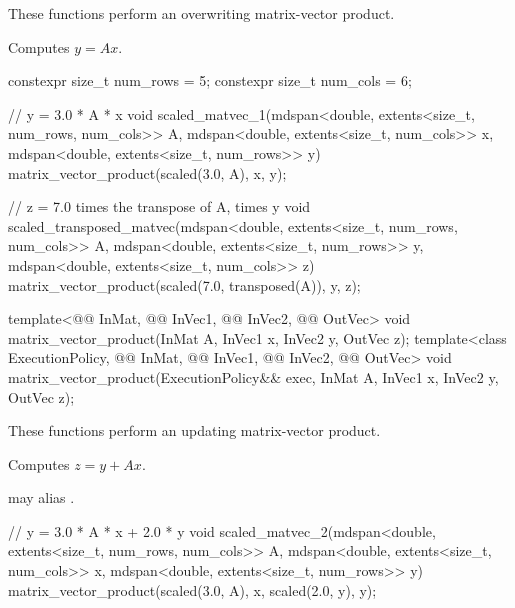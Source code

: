 \begin{itemdescr}
\pnum
These functions perform an overwriting matrix-vector product.

\pnum
\effects
Computes $y = A x$.
\end{itemdescr}

\begin{example}
\begin{codeblock}
constexpr size_t num_rows = 5;
constexpr size_t num_cols = 6;

// y = 3.0 * A * x
void scaled_matvec_1(mdspan<double, extents<size_t, num_rows, num_cols>> A,
  mdspan<double, extents<size_t, num_cols>> x, mdspan<double, extents<size_t, num_rows>> y) {
  matrix_vector_product(scaled(3.0, A), x, y);
}

// z = 7.0 times the transpose of A, times y
void scaled_transposed_matvec(mdspan<double, extents<size_t, num_rows, num_cols>> A,
  mdspan<double, extents<size_t, num_rows>> y, mdspan<double, extents<size_t, num_cols>> z) {
  matrix_vector_product(scaled(7.0, transposed(A)), y, z);
}
\end{codeblock}
\end{example}

%
\begin{itemdecl}
  template<@@ InMat, @@ InVec1, @@ InVec2, @@ OutVec>
    void matrix_vector_product(InMat A, InVec1 x, InVec2 y, OutVec z);
  template<class ExecutionPolicy,
           @@ InMat, @@ InVec1, @@ InVec2, @@ OutVec>
    void matrix_vector_product(ExecutionPolicy&& exec,
                               InMat A, InVec1 x, InVec2 y, OutVec z);
\end{itemdecl}

\begin{itemdescr}
\pnum
These functions perform an updating matrix-vector product.

\pnum
\effects
Computes $z = y + A x$.

\pnum
\remarks
{} may alias .
\end{itemdescr}

\begin{example}
\begin{codeblock}
// y = 3.0 * A * x + 2.0 * y
void scaled_matvec_2(mdspan<double, extents<size_t, num_rows, num_cols>> A,
  mdspan<double, extents<size_t, num_cols>> x, mdspan<double, extents<size_t, num_rows>> y) {
  matrix_vector_product(scaled(3.0, A), x, scaled(2.0, y), y);
}
\end{codeblock}
\end{example}

